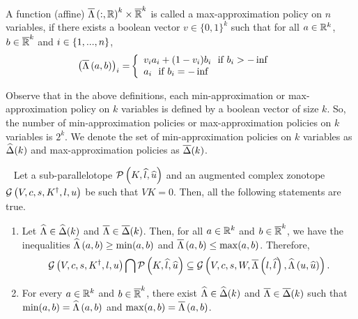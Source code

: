 \begin{definition} A function (affine)
  $\overline{\Lambda}\left(:,\mathbb{R}\right)^k\times\mathbb{\overline{R}}^k$ is called a
  max-approximation policy on $n$ variables, if there exists a boolean
  vector $v\in\{0,1\}^k$ such that for all $a\in\mathbb{R}^k$,
  $b\in\mathbb{\overline{R}}^k$ and $i\in\{1,...,n\}$,
\begin{align}
\left(\overline{\Lambda}\left(a,b\right)\right)_i= &\left\{
\begin{array}{l}
v_ia_i+(1-v_i)b_i~~\text{if}~b_i>-\inf\\
a_i~~\text{if}~b_i=-\inf
\end{array}
\right.
\end{align}
\end{definition}
%
Observe that in the above definitions, each min-approximation or
max-approximation policy on $k$ variables is defined by a boolean
vector of size $k$.  So, the number of min-approximation policies or
max-approximation policies on $k$ variables is $2^k$.  We denote the
set of min-approximation policies on $k$ variables as
$\widehat{\Delta}(k)$ and max-approximation policies as
$\overline{\Delta}(k)$.


\begin{lemma}~\label{lem:affineapproximation} Let a sub-parallelotope
  $\mathcal{P}\left(K,\widehat{l},\widehat{u}\right)$ and an augmented complex zonotope
  $\mathcal{G}\left(V,c,s,K^\dagger,l,u\right)$ be such that $VK=0$.  Then,
  all
  the following statements are true.
\begin{enumerate}
\item Let $\widehat{\Lambda}\in\widehat{\Delta}(k)$ and
  $\overline{\Lambda}\in\overline{\Delta}(k)$.  %
  Then, for all $a
  \in\mathbb{R}^k$ and $b\in\mathbb{\overline{R}}^k$, we have the inequalities $\widehat{\Lambda}\left(a,b\right)\geq \min(a,b)$ and
  $\overline{\Lambda}\left(a,b\right)\leq \max(a,b)$.
  Therefore, \[\mathcal{G}\left(V,c,s,K^\dagger,l,u\right)\bigcap \mathcal{P}\left(K,\widehat{l},\widehat{u}\right) \subseteq
  \mathcal{G}\left(V,c,s,W,\overline{\Lambda}\left(l,\widehat{l}\right),\widehat{\Lambda}\left(u,\widehat{u}\right)\right).\]
\item For every $a\in\mathbb{R}^k$ and $b\in\mathbb{\overline{R}}^k$, there exist
  $\widehat{\Lambda}\in\widehat{\Delta}(k)$ and
  $\overline{\Lambda}\in\overline{\Delta}(k)$ such that 
  $\min(a,b)=\widehat{\Lambda}\left(a,b\right)$ and $\max(a,b)=\overline{\Lambda}\left(a,b\right)$.  
\end{enumerate}
\end{lemma}





